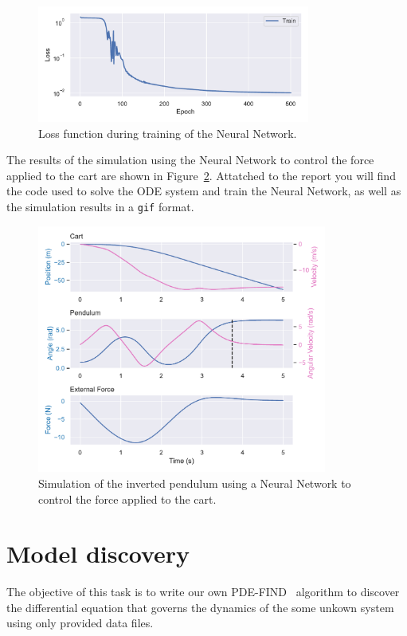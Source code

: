 \documentclass[unicode,11pt,a4paper,oneside,numbers=endperiod,openany]{scrartcl}
\begin{document}
\begin{figure}[h!]
    \hspace*{-1cm}
    \centering
    \includegraphics[width=0.8\textwidth]{../Task1/figures/loss_function.pdf}
    \caption{Loss function during training of the Neural Network.}
    \label{fig:loss}
\end{figure}
The results of the simulation using the Neural Network to control the force
applied to the cart are shown in Figure~\ref{fig:pendulum_nn}.
Attatched to the report you will find the code used to solve the ODE system and
train the Neural Network, as well as the simulation results in a \texttt{gif} format.
\begin{figure}[h!]
    \centering
    \includegraphics[width=0.85\textwidth]{../Task1/figures/pendulum_nn.pdf}
    \caption{Simulation of the inverted pendulum using a Neural Network to
    control the force applied to the cart.}
    \label{fig:pendulum_nn}
\end{figure}

\newpage
\section{Model discovery}\label{sec:task2}
The objective of this task is to write our own PDE-FIND~\cite{PDEFIND} algorithm to discover the
differential equation that governs the dynamics of the some unkown system using
only provided data files.
\end{document}
